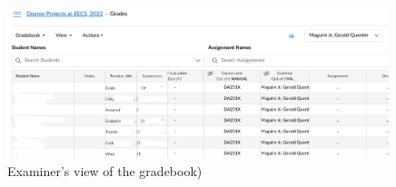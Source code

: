 \begin{figure}[!ht]
  \begin{center}
    \includegraphics[width=0.99\textwidth]{README_notes/README-examiner-figures/part-of-my-students-Screenshot_20220325_152422-edited.png}
  \end{center}
  \caption{Examiner's view of the gradebook)}
  \label{fig:examinersViewOfGradebook}
\end{figure}

